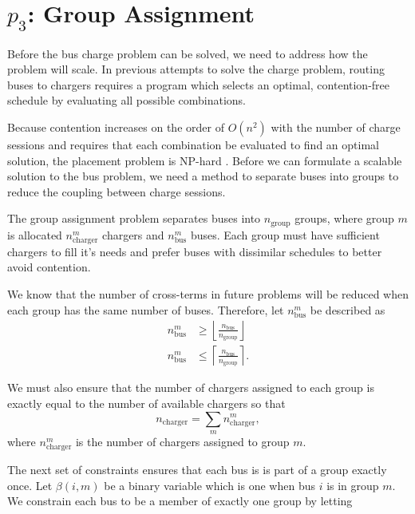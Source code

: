 \section{$p_3$: Group Assignment\label{sec:groupAssignment}}
Before the bus charge problem can be solved, we need to address how the problem will scale. In previous attempts to solve the charge problem, routing buses to chargers requires a program which selects an optimal, contention-free schedule by evaluating all possible combinations.
\par Because contention increases on the order of $O(n^2)$ with the number of charge sessions and requires that each combination be evaluated to find an optimal solution, the placement problem is NP-hard \cite{kolesar_branch_1967}. Before we can formulate a scalable solution to the bus problem, we need a method to separate buses into groups to reduce the coupling between charge sessions.
\par The group assignment problem separates buses into $n_{\text{group}}$ groups, where group $m$ is allocated $n^m_{\text{charger}}$ chargers and $n^m_{\text{bus}}$ buses. Each group must have sufficient chargers to fill it's needs and prefer buses with dissimilar schedules to better avoid contention. 
\par We know that the number of cross-terms in future problems will be reduced when each group has the same number of buses. Therefore, let $n^m_{\text{bus}}$ be described as
\begin{equation}\label{eqn:groups:nBusPerGroup}\begin{aligned}
	n^m_{\text{bus}} &\ge \left \lfloor \frac{n_{\text{bus}}}{n_{\text{group}}} \right \rfloor \\
	n^m_{\text{bus}} &\le \left \lceil \frac{n_{\text{bus}}}{n_{\text{group}}} \right \rceil.
\end{aligned}\end{equation}
\par We must also ensure that the number of chargers assigned to each group is exactly equal to the number of available chargers so that
\begin{equation}\label{eqn:groups:nTotalCharger}
	n_{\text{charger}} = \sum_mn_{\text{charger}}^m,
\end{equation}
where $n_{\text{charger}}^m$ is the number of chargers assigned to group $m$.
\par The next set of constraints ensures that each bus is is part of a group exactly once. Let $\beta(i,m)$ be a binary variable which is one when bus $i$ is in group $m$. We constrain each bus to be a member of exactly one group by letting
